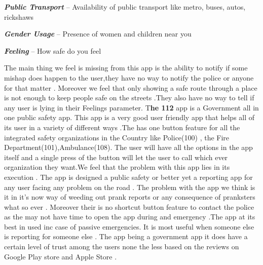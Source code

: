 \documentclass[	DIV=calc,%
							paper=a4,%
							fontsize=12pt,%
							twocolumn]{scrartcl}
\newcommand{\initial}[1]{%
     \lettrine[lines=3,lhang=0.3,nindent=0em]{
     				\color{DarkGoldenrod}
     				{\textsf{#1}}}{}}
\begin{document}
\textbf{\textit{Public Transport}} – Availability of public transport like metro, buses, autos, rickshaws

\textbf{\textit{Gender Usage}} – Presence of women and children near you

\textbf{\textit{Feeling}} – How safe do you feel

The main thing we feel is missing from this app is the ability to notify if some mishap does happen to the user,they have no way to notify the police or anyone for that matter . Moreover we feel that only showing a safe route through a place is not enough to keep people safe on the streets .They also have no way to tell if any user is lying in their Feelings parameter.
\vspace{8mm}
\newline\initial{T}\textbf{he 112} app is a Government all in one public safety app. This app is a very good user friendly app that helps all of its user in a variety of different ways .The has one button feature for all the integrated safety organizations in the Country like Police(100) , the Fire Department(101),Ambulance(108). The user will have all the options in the app itself and a single press of the button will let the user to call which ever organization they want.We feel that the problem with this app lies in its execution . The app is designed a  public safety or better yet a reporting app for any user facing any problem on the road . The problem with the app we think is it in it's now way of weeding out prank reports or any consequence of pranksters what so ever . Moreover their is no shortcut button feature to contact the police as the may not have time to open the app during and emergency .The app at its best in used inc case of passive emergencies. It is most useful when someone else is reporting for someone else . The app being a government app it does have a certain level of trust among the users none the less based on the reviews on Google Play store and Apple Store .
\vspace{8mm}
\end{document}
